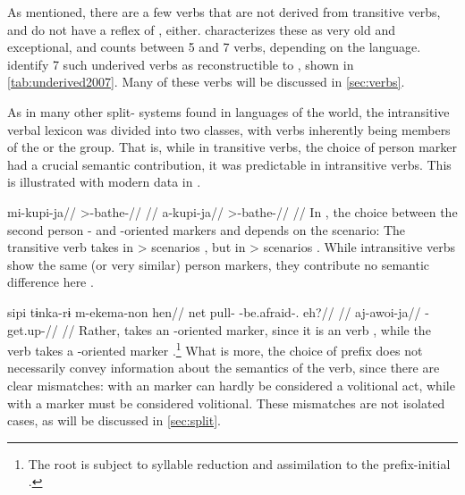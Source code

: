 As mentioned, there are a few  verbs that are not derived from transitive verbs, and do not have a reflex of \detrz, either.
\textcite[221]{meira2000split} characterizes these as very old and exceptional, and counts between 5 and 7 verbs, depending on the language.
\textcite{gildea2007greenberg} identify 7 such underived  verbs as reconstructible to \PC, shown in \cref{tab:underived2007}.
Many of these verbs will be discussed in \cref{sec:verbs}.



As in many other split- systems found in languages of the world, the intransitive verbal lexicon was divided into two classes, with verbs inherently being members of the  or the  group.
That is, while in transitive verbs, the choice of person marker had a crucial semantic contribution, it was predictable in intransitive verbs.
This is illustrated with modern \kalina data in .

 \kalina
{}
\begingl
\gla mi-kupi-ja//
\glb {}>-bathe-//
\glft {} \parencite[][160]{hoff1968carib}//
\endgl
{}
\begingl
\gla a-kupi-ja//
\glb {}>-bathe-//
\glft {} \parencite[][63]{yamada2011evidentiality}//
\endgl
\xe
%
In , the choice between the second person - and -oriented markers  and  depends on the scenario:
The transitive verb   takes  in > scenarios , but  in > scenarios .
While intransitive verbs show the same (or very similar) person markers, they contribute no semantic difference here .

 \kalina
{}
\begingl
\gla sipi tɨnka-rɨ m-ekema-non hen//
\glb net pull- -be.afraid-. eh?//
\glft {} \parencite[][253]{courtz2008carib}//
\endgl
{}
\begingl
\gla aj-awoi-ja//
\glb {}-get.up-//
\glft {} \parencite[][167]{hoff1968carib}//
\endgl
\xe
%
Rather,   takes an -oriented marker, since it is an  verb , while the  verb   takes a -oriented marker .\footnote{The root   is subject to syllable reduction and assimilation to the prefix-initial .}
What is more, the choice of prefix does not necessarily convey information about the semantics of the verb, since there are clear mismatches:
 with an  marker can hardly be considered a volitional act, while   with a  marker must be considered volitional.
These mismatches are not isolated cases, as will be discussed in \cref{sec:split}.


